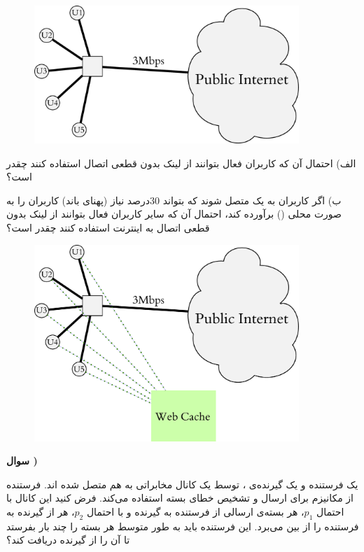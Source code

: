 \documentclass{article}
\newcounter{questionnumber}
\newcommand{\Q}{
\textbf{سوال \thequestionnumber)}
\stepcounter{questionnumber}
}
\begin{document}
\begin{figure}[h]
\centering
\includegraphics[width=100mm]{Q2_1.eps}
\end{figure}

الف) احتمال آن که کاربران فعال بتوانند از لینک بدون قطعی اتصال استفاده کنند چقدر است؟

ب) اگر کاربران به یک  متصل شوند که بتواند 30درصد نیاز (پهنای باند) کاربران را به صورت محلی () برآورده کند، احتمال آن که سایر کاربران فعال بتوانند از لینک بدون قطعی اتصال به اینترنت استفاده کنند چقدر است؟

\begin{figure}[h]
\centering
\includegraphics[width=100mm]{Q2_2.eps}
\end{figure}

\newpage
\Q

یک فرستنده و یک گیرنده‌ی ، توسط یک کانال مخابراتی به هم متصل شده اند. فرستنده از مکانیزم  برای ارسال و تشخیص خطای بسته استفاده می‌کند. فرض کنید این کانال با احتمال
$
p_1
$،
هر بسته‌ی ارسالی از فرستنده به گیرنده و با احتمال 
$
p_2
$،
هر  از گیرنده به فرستنده را از بین می‌برد. این فرستنده باید به طور متوسط هر بسته را چند بار بفرستد تا  آن را از گیرنده دریافت کند؟
\end{document}

